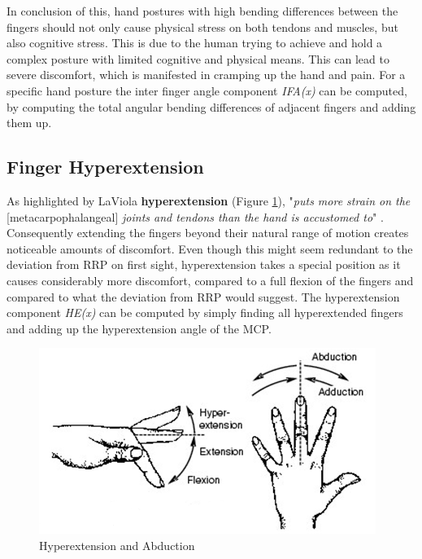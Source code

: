 In conclusion of this, hand postures with high bending differences between the fingers should not only cause physical stress on both tendons and muscles, but also cognitive stress. This is due to the human trying to achieve and hold a complex posture with limited cognitive and physical means.
This can lead to severe discomfort, which is manifested in cramping up the hand and pain.
For a specific hand posture the inter finger angle component \textit{IFA(x)} can be computed, by computing the total angular bending differences of adjacent fingers and adding them up.

\subsection{Finger Hyperextension}

As highlighted by LaViola \cite{laviola1999survey} \textbf{hyperextension} (Figure \ref{fig:hyperabduction}), "\textit{puts more strain on the }[metacarpophalangeal] \textit{joints and tendons than the hand is accustomed to}" \cite{laviola1999survey}. Consequently extending the fingers beyond their natural range of motion creates noticeable amounts of discomfort. Even though this might seem redundant to the deviation from RRP on first sight, hyperextension takes a special position as it causes considerably more discomfort, compared to a full flexion of the fingers and compared to what the deviation from RRP would suggest. The hyperextension component \textit{HE(x)} can be computed by simply finding all hyperextended fingers and adding up the hyperextension angle of the MCP. 

\begin{figure}
\centering
\includegraphics[width=\textwidth]{abduction}
\caption{Hyperextension and Abduction}
\label{fig:hyperabduction}
\end{figure}

